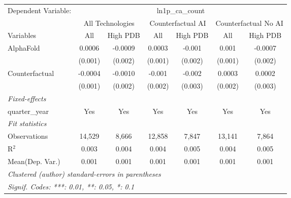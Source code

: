 \begingroup
\centering
\begin{tabular}{lcccccc}
   \tabularnewline \midrule \midrule
   Dependent Variable: & \multicolumn{6}{c}{ln1p\_ca\_count}\\
 & \multicolumn{2}{c}{All Technologies} & \multicolumn{2}{c}{Counterfactual AI} & \multicolumn{2}{c}{Counterfactual No AI} \\
\cmidrule(lr){1-1}\cmidrule(lr){2-3} \cmidrule(lr){4-5} \cmidrule(lr){6-7}
Variables & \multicolumn{1}{c}{All} & \multicolumn{1}{c}{High PDB} & \multicolumn{1}{c}{All} & \multicolumn{1}{c}{High PDB} & \multicolumn{1}{c}{All} & \multicolumn{1}{c}{High PDB} \\
\cmidrule(lr){1-1}\cmidrule(lr){2-2} \cmidrule(lr){3-3} \cmidrule(lr){4-4} \cmidrule(lr){5-5} \cmidrule(lr){6-6} \cmidrule(lr){7-7}
   AlphaFold      & 0.0006  & -0.0009 & 0.0003  & -0.001  & 0.001   & -0.0007\\   
                  & (0.001) & (0.002) & (0.001) & (0.002) & (0.001) & (0.002)\\   
   Counterfactual & -0.0004 & -0.0010 & -0.001  & -0.002  & 0.0003  & 0.0002\\   
                  & (0.001) & (0.002) & (0.002) & (0.003) & (0.002) & (0.003)\\   
   \midrule
   \emph{Fixed-effects}\\
   quarter\_year  & Yes     & Yes     & Yes     & Yes     & Yes     & Yes\\  
   \midrule
   \emph{Fit statistics}\\
   Observations   & 14,529  & 8,666   & 12,858  & 7,847   & 13,141  & 7,864\\  
   R$^2$          & 0.003   & 0.004   & 0.004   & 0.005   & 0.004   & 0.005\\  
Mean(Dep. Var.) & 0.001 & 0.001 & 0.001 & 0.001 & 0.001 & 0.001 \\
   \midrule \midrule
   \multicolumn{7}{l}{\emph{Clustered (author) standard-errors in parentheses}}\\
   \multicolumn{7}{l}{\emph{Signif. Codes: ***: 0.01, **: 0.05, *: 0.1}}\\
\end{tabular}
\par\endgroup
